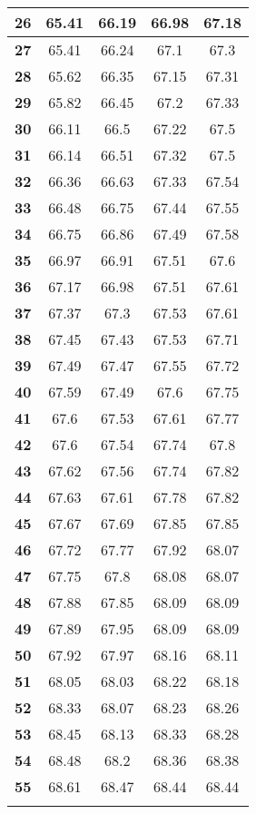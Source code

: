 \begin{longtable}{|c|c|c|c|c|}
\textbf{26} & 65.41 & 66.19 & 66.98 & 67.18 \\ \hline 
\textbf{27} & 65.41 & 66.24 & 67.1 & 67.3 \\ \hline 
\textbf{28} & 65.62 & 66.35 & 67.15 & 67.31 \\ \hline 
\textbf{29} & 65.82 & 66.45 & 67.2 & 67.33 \\ \hline 
\textbf{30} & 66.11 & 66.5 & 67.22 & 67.5 \\ \hline 
\textbf{31} & 66.14 & 66.51 & 67.32 & 67.5 \\ \hline 
\textbf{32} & 66.36 & 66.63 & 67.33 & 67.54 \\ \hline 
\textbf{33} & 66.48 & 66.75 & 67.44 & 67.55 \\ \hline 
\textbf{34} & 66.75 & 66.86 & 67.49 & 67.58 \\ \hline 
\textbf{35} & 66.97 & 66.91 & 67.51 & 67.6 \\ \hline 
\textbf{36} & 67.17 & 66.98 & 67.51 & 67.61 \\ \hline 
\textbf{37} & 67.37 & 67.3 & 67.53 & 67.61 \\ \hline 
\textbf{38} & 67.45 & 67.43 & 67.53 & 67.71 \\ \hline 
\textbf{39} & 67.49 & 67.47 & 67.55 & 67.72 \\ \hline 
\textbf{40} & 67.59 & 67.49 & 67.6 & 67.75 \\ \hline 
\textbf{41} & 67.6 & 67.53 & 67.61 & 67.77 \\ \hline 
\textbf{42} & 67.6 & 67.54 & 67.74 & 67.8 \\ \hline 
\textbf{43} & 67.62 & 67.56 & 67.74 & 67.82 \\ \hline 
\textbf{44} & 67.63 & 67.61 & 67.78 & 67.82 \\ \hline 
\textbf{45} & 67.67 & 67.69 & 67.85 & 67.85 \\ \hline 
\textbf{46} & 67.72 & 67.77 & 67.92 & 68.07 \\ \hline 
\textbf{47} & 67.75 & 67.8 & 68.08 & 68.07 \\ \hline 
\textbf{48} & 67.88 & 67.85 & 68.09 & 68.09 \\ \hline 
\textbf{49} & 67.89 & 67.95 & 68.09 & 68.09 \\ \hline 
\textbf{50} & 67.92 & 67.97 & 68.16 & 68.11 \\ \hline 
\textbf{51} & 68.05 & 68.03 & 68.22 & 68.18 \\ \hline 
\textbf{52} & 68.33 & 68.07 & 68.23 & 68.26 \\ \hline 
\textbf{53} & 68.45 & 68.13 & 68.33 & 68.28 \\ \hline 
\textbf{54} & 68.48 & 68.2 & 68.36 & 68.38 \\ \hline 
\textbf{55} & 68.61 & 68.47 & 68.44 & 68.44 \\ \hline 

    \caption[]{}
    \label{Tab:}
\end{longtable}